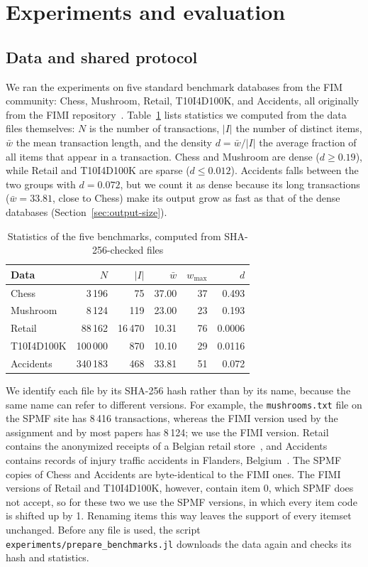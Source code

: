 \section{Experiments and evaluation}
\label{sec:evaluation}
\subsection{Data and shared protocol}
\label{sec:protocol}
We ran the experiments on five standard benchmark databases from the FIM community:
Chess, Mushroom, Retail, T10I4D100K, and Accidents, all originally from the FIMI
repository~\cite{fimi}. Table~\ref{tab:datasets} lists statistics we computed from the
data files themselves: $N$ is the number of transactions, $|I|$ the number of distinct
items, $\bar{w}$ the mean transaction length, and the density $d = \bar{w} / |I|$ the
average fraction of all items that appear in a transaction. Chess and Mushroom are dense
($d \ge 0.19$), while Retail and T10I4D100K are sparse ($d \le 0.012$). Accidents falls
between the two groups with $d = 0.072$, but we count it as dense because its long
transactions ($\bar{w} = 33.81$, close to Chess) make its output grow as fast as that of
the dense databases (Section~\ref{sec:output-size}).

\begin{table}[t]
\centering
\caption{Statistics of the five benchmarks, computed from SHA-256-checked files}
\label{tab:datasets}
\begin{tabular}{lrrrrr}
\hline
Data & $N$ & $|I|$ & $\bar{w}$ & $w_{\max}$ & $d$ \\
\hline
Chess & 3\,196 & 75 & 37.00 & 37 & 0.493 \\
Mushroom & 8\,124 & 119 & 23.00 & 23 & 0.193 \\
Retail & 88\,162 & 16\,470 & 10.31 & 76 & 0.0006 \\
T10I4D100K & 100\,000 & 870 & 10.10 & 29 & 0.0116 \\
Accidents & 340\,183 & 468 & 33.81 & 51 & 0.072 \\
\hline
\end{tabular}
\end{table}

We identify each file by its SHA-256 hash rather than by its name, because the same name
can refer to different versions. For example, the \texttt{mushrooms.txt} file on the SPMF
site has 8\,416 transactions, whereas the FIMI version used by the assignment and by most
papers has 8\,124; we use the FIMI version. Retail contains the anonymized receipts of a
Belgian retail store~\cite{brijs1999}, and Accidents contains records of injury traffic
accidents in Flanders, Belgium~\cite{geurts2003}. The SPMF copies of Chess and Accidents
are byte-identical to the FIMI ones. The FIMI versions of Retail and T10I4D100K, however,
contain item 0, which SPMF does not accept, so for these two we use the SPMF versions, in
which every item code is shifted up by 1. Renaming items this way leaves the support of
every itemset unchanged. Before any file is used, the script
\texttt{experiments/prepare\_benchmarks.jl} downloads the data again and checks its hash
and statistics.

